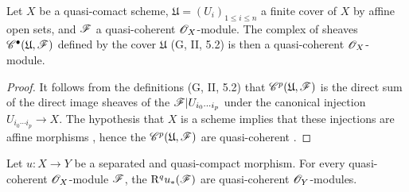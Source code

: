 \begin{lemma}[1.4.9]
\label{III.1.4.9}
Let $X$ be a quasi-comact scheme, $\mathfrak{U}=(U_i)_{1\leq i\leq n}$ a finite cover of $X$ by affine open sets, and $\mathscr{F}$ a quasi-coherent $\mathscr{O}_X$-module.
The complex of sheaves $\mathscr{C}^\bullet(\mathfrak{U},\mathscr{F})$ defined by the cover $\mathfrak{U}$ (G, II, 5.2) is then a quasi-coherent $\mathscr{O}_X$-module.
\end{lemma}

\begin{proof}
\label{proof-III.1.4.9}
It follows from the definitions (G, II, 5.2) that $\mathscr{C}^p(\mathfrak{U},\mathscr{F})$ is the direct sum of the direct image sheaves of the $\mathscr{F}|U_{i_0\cdots i_p}$ under the canonical injection $U_{i_0\cdots i_p}\to X$.
The hypothesis that $X$ is a scheme implies that these injections are affine morphisms , hence the $\mathscr{C}^p(\mathfrak{U},\mathscr{F})$ are quasi-coherent .
\end{proof}

\begin{proposition}[1.4.10]
\label{III.1.4.10}
Let $u:X\to Y$ be a separated and quasi-compact morphism.
For every quasi-coherent $\mathscr{O}_X$-module $\mathscr{F}$, the $\mathrm{R}^q u_*(\mathscr{F})$ are quasi-coherent $\mathscr{O}_Y$-modules.
\end{proposition}

